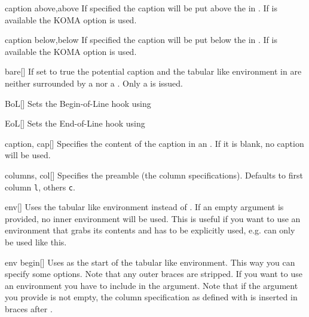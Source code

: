 \begin{describeopt}{caption above,above}%
  If specified the caption will be put above the  in
  . If  is available the KOMA option
   is used.
\end{describeopt}%
\begin{describeopt}{caption below,below}%
  If specified the caption will be put below the  in
  . If  is available the KOMA option
   is used.
\end{describeopt}%
\begin{describeopt}{bare}[]
  If set to true the potential caption and the tabular like environment in
   are neither surrounded by a  nor a .
  Only a  is issued.
\end{describeopt}
\begin{describeopt}{BoL}[]%
  Sets the  Begin-of-Line hook using 
\end{describeopt}%
\begin{describeopt}{EoL}[]%
  Sets the  End-of-Line hook using 
\end{describeopt}%
\begin{describeopt}{caption, cap}[]%
  Specifies the content of the caption in an . If it is blank, no
  caption will be used.
\end{describeopt}%
\begin{describeopt}{columns, col}[]%
  Specifies the  preamble (the column specifications). Defaults
  to first column \texttt{l}, others \texttt{c}.
\end{describeopt}%
\begin{describeopt}{env}[]%
  Uses the tabular like environment  instead of . If
  an empty argument is provided, no inner environment will be used. This is
  useful if you want to use an environment that grabs its contents and has to be
  explicitly used, e.g.  can only be used like this.
\end{describeopt}%
\begin{describeopt}{env begin}[]%
  Uses  as the start of the tabular like environment. This way you
  can specify some options. Note that any outer braces are stripped. If you want
  to use an environment you have to include  in the argument. Note
  that if the argument you provide is not empty, the column specification as
  defined with  is inserted in braces after .
\end{describeopt}%
